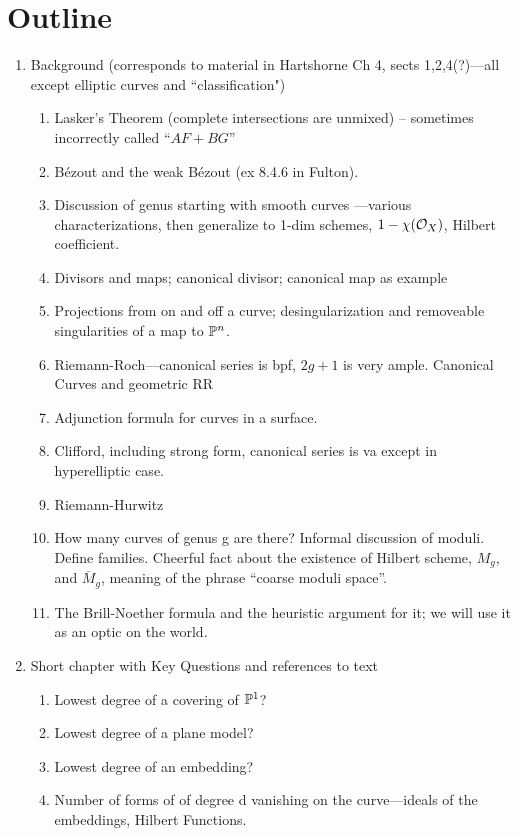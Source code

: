 \documentclass[12pt, leqno]{article}
\begin{document}
\section*{Outline}
 \begin{enumerate}

\item Background (corresponds to material in Hartshorne Ch 4, sects 1,2,4(?)---all except elliptic curves and ``classification")
\begin{enumerate}
\item Lasker's Theorem (complete intersections are unmixed) -- sometimes incorrectly called ``$AF+BG$''
\item B\'ezout and the  weak B\'ezout (ex 8.4.6 in Fulton).
\item Discussion of genus starting with smooth curves ---various characterizations, then generalize to 1-dim schemes, $1 -\chi({\mathcal O}_X)$, Hilbert coefficient.
\item Divisors and maps; canonical divisor; canonical map as example
\item Projections from on and off a curve; desingularization and removeable singularities of a map to ${\mathbb P}^n$.
\item Riemann-Roch---canonical series is bpf, $2g+1$ is very ample. Canonical Curves and geometric RR
\item Adjunction formula for curves in a surface.
\item Clifford, including strong form, canonical series is va except in hyperelliptic case.
\item Riemann-Hurwitz
\item How many curves of genus g are there? Informal discussion of moduli. Define families. Cheerful fact about the existence of  Hilbert scheme, $M_g$, and $\overline M_g$, meaning of the phrase ``coarse moduli space''.
\item The Brill-Noether formula and the heuristic argument for it; we will use it as an optic on the world.

\end{enumerate}

\item Short chapter with Key Questions and references to text
\begin{enumerate}
 \item Lowest degree of a covering of ${\mathbb P}^1$?
 \item Lowest degree of a plane model?
 \item Lowest degree of an embedding?
 \item Number of forms of of degree d vanishing on the curve---ideals of the embeddings, Hilbert Functions.
\end{enumerate}


\end{enumerate}
\end{document}
